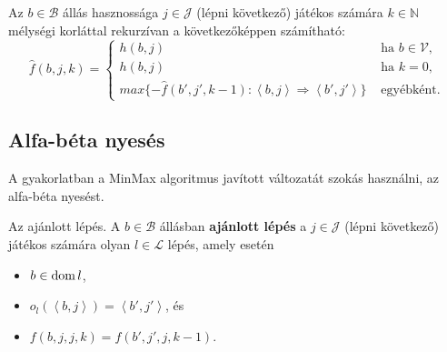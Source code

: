 Az $b \in \mathcal{B}$ állás hasznossága $j \in \mathcal{J}$ (lépni következő)
játékos számára $k \in \mathbb{N}$ mélységi korláttal rekurzívan a következőképpen
számítható: \[
    \hat{f} (b, j, k) = \begin{cases}
        h(b,j) & \text{ ha } b \in \mathcal{V},\\
        h(b,j) & \text{ ha } k = 0,\\
        max \{
            -\hat{f}(b', j', k-1) : \left<b,j \right> \Rightarrow \left<b',j' \right>
        \}
               & \text{ egyébként.}
    \end{cases}
\]

\subsection{Alfa-béta nyesés}

A gyakorlatban a MinMax algoritmus javított változatát szokás használni, az
alfa-béta nyesést.

\begin{definicio}
    Az ajánlott lépés.
    A $b \in \mathcal{B}$ állásban {\bf ajánlott lépés} a $j \in \mathcal{J}$
    (lépni következő) játékos számára olyan $l \in \mathcal{L}$ lépés, amely esetén
    \begin{itemize}
        \item $b \in \operatorname{dom} l$,
        \item $o_l\left(\left<b,j \right> \right) = \left<b', j' \right>$, és
        \item $f(b,j,j,k) = f(b', j', j, k-1)$.
    \end{itemize}
\end{definicio}
